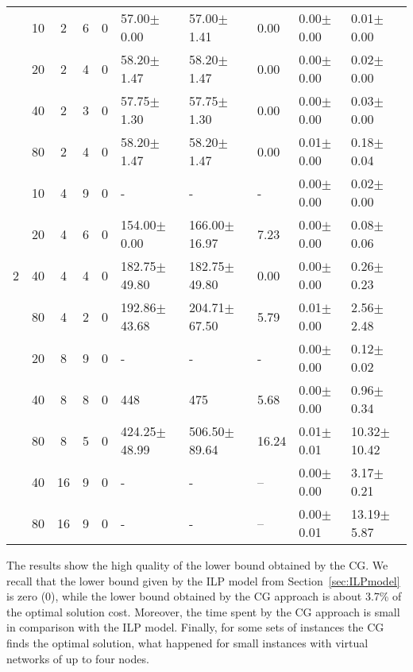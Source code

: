 \documentclass[12pt]{article}
\begin{document}
\begin{table}[h]
\begin{center}
\begin{tabular}{c c c| c c l l l l l}
\hline                                                                                          
&10 & 2    & 6 & 0 &  57.00$\pm$0.00        &  57.00$\pm$1.41     &   0.00      &  0.00$\pm$0.00 &  0.01$\pm$0.00        \\
&20 & 2    & 4 & 0 &  58.20$\pm$1.47        &  58.20$\pm$1.47     &   0.00      &  0.00$\pm$0.00 &  0.02$\pm$0.00        \\
&40 & 2    & 3 & 0 &  57.75$\pm$1.30        &  57.75$\pm$1.30     &   0.00      &  0.00$\pm$0.00 &  0.03$\pm$0.00        \\
&80 & 2    & 4 & 0 &  58.20$\pm$1.47        &  58.20$\pm$1.47     &   0.00      &  0.01$\pm$0.00 &  0.18$\pm$0.04        \\
&10 & 4    & 9 & 0 &  -                   &  -                    &   -         &  0.00$\pm$0.00 &  0.02$\pm$0.00        \\
&20 & 4    & 6 & 0 &  154.00$\pm$0.00       &  166.00$\pm$16.97   &   7.23      &  0.00$\pm$0.00 &  0.08$\pm$0.06        \\
2&40 & 4   & 4 & 0 &  182.75$\pm$49.80      &  182.75$\pm$49.80    &  0.00      &  0.00$\pm$0.00 &  0.26$\pm$0.23        \\
&80 & 4    & 2 & 0 &  192.86$\pm$43.68      &  204.71$\pm$67.50   &   5.79      &  0.01$\pm$0.00 &  2.56$\pm$2.48        \\
&20 & 8    & 9 & 0 &  -                     &  -                  &   -         &  0.00$\pm$0.00 &  0.12$\pm$0.02         \\
&40 & 8    & 8 & 0 &  448                   &  475                &  5.68       &  0.00$\pm$0.00 &  0.96$\pm$0.34        \\
&80 & 8    & 5 & 0 &  424.25$\pm$48.99      &  506.50$\pm$89.64   &  16.24      &  0.01$\pm$0.01 &  10.32$\pm$10.42       \\
&40 & 16   & 9 & 0 &  -                     &  -                  &  --         &  0.00$\pm$0.00 &  3.17$\pm$0.21         \\
&80 & 16   & 9 & 0 &  -                     &  -                  &  --         &  0.00$\pm$0.01 &  13.19$\pm$5.87        \\
\end{tabular}
\end{center}
\end{table}
The results show the high quality of the lower bound obtained by the CG. We recall that the lower bound given by the ILP model from Section~\ref{sec:ILPmodel} is zero (0),
while the lower bound obtained by the CG approach is about 3.7\% of the optimal solution cost.
Moreover, the time spent by the CG approach is small in comparison with the ILP model.
Finally, for some sets of instances the CG finds the optimal solution, what happened for small instances with virtual networks of up to four nodes.
\end{document}
